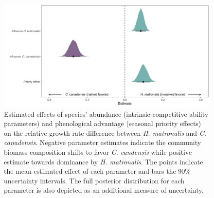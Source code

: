 \documentclass{article}[11pt]
\begin{document}
\begin{figure}[h!]
    \centering
\includegraphics[width=\textwidth]{..//figure/mu_plots.jpeg}
    \caption{Estimated effects of species' abundance (intrinsic competitive ability parameters) and phenological advantage (seasonal priority effects) on the relative growth rate difference between \textit{H. matronalis} and \textit{C. canadensis}. Negative parameter estimates indicate the community biomass composition shifts to favor \textit{C. candensis} while positive estimate towards dominance by \textit{ H. matronalis}. The points indicate the mean estimated effect of each parameter and bars the 90\% uncertainty intervals. The full posterior distribution for each parameter is also depicted as an additional measure of uncertainty.} 
    \label{fig:RGRD}
\end{figure}


\end{document}
